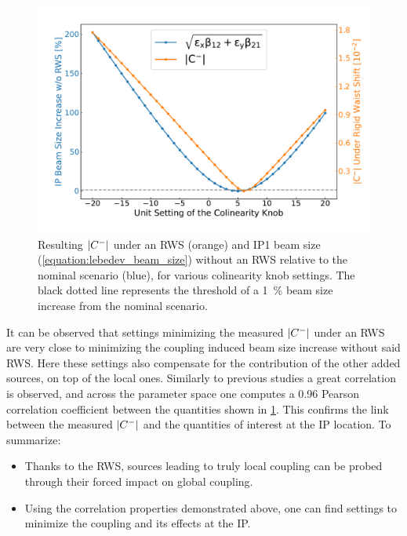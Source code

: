\begin{figure}[!htb]
    \centering
    \includegraphics*[width=\textwidth]{Figures/IR_Coupling_Correction/full_scenario_cminus_and_ip_size.pdf}
    \caption{Resulting \(\left\lvert C^{-} \right\rvert\) under an RWS (\textcolor{mplorange}{orange}) and IP\num{1} beam size (\cref{equation:lebedev_beam_size}) without an RWS relative to the nominal scenario (\textcolor{mplblue}{blue}), for various colinearity knob settings. The black dotted line represents the threshold of a \qty{1}{\percent} beam size increase from the nominal scenario.}
    \label{figure:full_scenario_colin_correction_dqmin_lebedev}
\end{figure}

It can be observed that settings minimizing the measured \(\left\lvert C^{-} \right\rvert\) under an RWS are very close to minimizing the coupling induced beam size increase without said RWS.
Here these settings also compensate for the contribution of the other added sources, on top of the local ones.
Similarly to previous studies a great correlation is observed, and across the parameter space one computes a \num{0.96} Pearson correlation coefficient between the quantities shown in \cref{figure:full_scenario_colin_correction_dqmin_lebedev}.
This confirms the link between the measured \(\left\lvert C^{-} \right\rvert\) and the quantities of interest at the IP location.
To summarize:

\begin{itemize}
    \item Thanks to the RWS, sources leading to truly local coupling can be probed through their forced impact on global coupling.
    \item Using the correlation properties demonstrated above, one can find settings to minimize the coupling and its effects at the IP.
\end{itemize}

